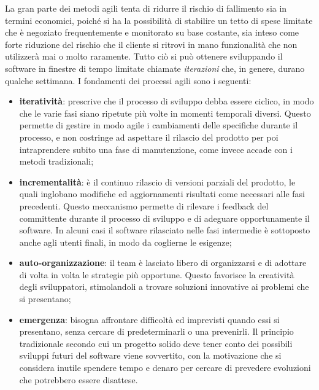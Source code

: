 La gran parte dei metodi agili tenta di ridurre il rischio di fallimento sia in termini economici, poiché si ha la possibilità di stabilire un tetto di spese limitate che è negoziato frequentemente e monitorato su base costante, sia inteso come forte riduzione del rischio che il cliente si ritrovi in mano funzionalità che non utilizzerà mai o molto raramente. Tutto ciò si può ottenere sviluppando il software in finestre di tempo limitate chiamate \textit{iterazioni} che, in genere, durano qualche settimana.
I fondamenti dei processi agili sono i seguenti:
\begin{itemize}
\item \textbf{iteratività}: prescrive che il processo di sviluppo debba essere ciclico, in modo che le varie fasi siano ripetute più volte in momenti temporali diversi. Questo permette di gestire in modo agile i cambiamenti delle specifiche durante il processo, e non costringe ad aspettare il rilascio del prodotto per poi intraprendere subito una fase di manutenzione, come invece accade con i metodi tradizionali;
\item \textbf{incrementalità}: è il continuo rilascio di versioni parziali del prodotto, le quali inglobano modifiche ed aggiornamenti risultati come necessari alle fasi precedenti. Questo meccanismo permette di rilevare i feedback del committente durante il processo di sviluppo e di adeguare opportunamente il software. In alcuni casi il software rilasciato nelle fasi intermedie è sottoposto anche agli utenti finali, in modo da coglierne le esigenze;
\item \textbf{auto-organizzazione}: il team è lasciato libero di organizzarsi e di adottare di volta in volta le strategie più opportune. Questo favorisce la creatività degli sviluppatori, stimolandoli a trovare soluzioni innovative ai problemi che si presentano;
\item \textbf{emergenza}: bisogna affrontare difficoltà ed imprevisti quando essi si presentano, senza cercare di predeterminarli o una prevenirli. Il principio tradizionale secondo cui un progetto solido deve tener conto dei possibili sviluppi futuri del software viene sovvertito, con la motivazione che si considera inutile spendere tempo e denaro per cercare di prevedere evoluzioni che potrebbero essere disattese.
\end{itemize}





